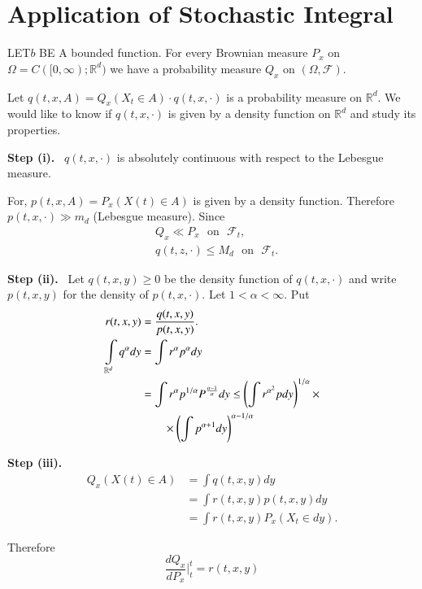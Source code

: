 \chapter{Application of Stochastic Integral}\label{chap33}

LET\pageoriginale $b$ BE A bounded function. For every Brownian measure
$P_{x}$ on $\Omega=C([0,\infty);\mathbb{R}^{d})$ we have a probability
  measure $Q_{x}$ on $(\Omega,\mathscr{F})$.


\begin{problem*}
Let $q(t,x,A)=Q_{x}(X_{t}\in A)\cdot q(t,x,\cdot)$ is a probability
measure on $\mathbb{R}^{d}$. We would like to know if $q(t,x,\cdot)$
is given by a density function on $\mathbb{R}^{d}$ and study its
properties. 
\end{problem*}

\noindent
{\bf Step (i).}~ $q(t,x,\cdot)$ is absolutely continuous with respect
to the Lebesgue measure.

For, $p(t,x,A)=P_{x}(X(t)\in A)$ is given by a density
function. Therefore $p(t,x,\cdot)\gg m_{d}$ (Lebesgue measure). Since 
\begin{align*}
& Q_{x}\ll P_{x}\text{~ on~ } \mathscr{F}_{t},\\
& q(t,z,\cdot)\leq M_{d}\text{~ on~ } \mathscr{F}_{t}.
\end{align*}

\noindent
{\bf Step (ii).}~ Let $q(t,x,y)\geq 0$ be the density function of
$q(t,x,\cdot)$ and write $p(t,x,y)$ for the density of
$p(t,x,\cdot)$. Let $1<\alpha<\infty$. Put
\begin{align*}
r(t,x,y) &= \frac{q(t,x,y)}{p(t,x,y)}.\\
\int\limits_{\mathbb{R}^{d}}q^{\alpha}dy &= \int
r^{\alpha}p^{\alpha}dy\\
&= \int r^{\alpha}p^{1/\alpha}P^{\frac{\alpha-1}{\alpha}}dy \leq
\left(\int r^{\alpha^{2}}pdy\right)^{1/\alpha}\times\\
&\qquad \times \left(\int p^{\alpha+1}dy\right)^{\alpha-1/\alpha}
\end{align*}


\noindent
{\bf Step (iii).}~ \pageoriginale
\begin{align*}
Q_{x}(X(t)\in A) &= \int q(t,x,y)dy\\
&= \int r(t,x,y)p(t,x,y)dy\\
&= \int r(t,x,y)P_{x}(X_{t}\in dy).
\end{align*}

Therefore
$$
\frac{dQ_{x}}{dP_{x}}\Big|^{t}_{t}=r(t,x,y)
$$

